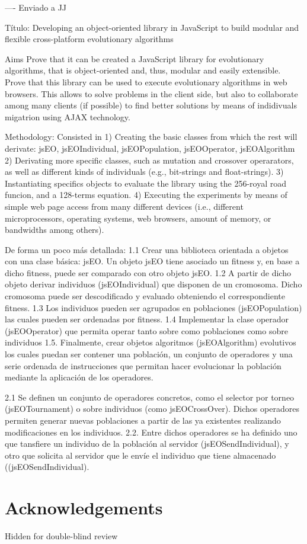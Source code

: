 \documentclass{llncs}
\begin{document}
----
Enviado a JJ

Título:
Developing an object-oriented library in JavaScript to build modular and flexible cross-platform evolutionary algorithms 

Aims
Prove that it can be created a JavaScript library for evolutionary algorithms, that is object-oriented and, thus, modular and easily extensible.
Prove that this library can be used to execute evolutionary algorithms in web browsers. This allows to solve problems in the client side, but also to collaborate among many clients (if possible) to find better solutions by means of indidivuals migatrion using AJAX technology.

Methodology:
Consisted in
1) Creating the basic classes from which the rest will derivate: jsEO, jsEOIndividual, jsEOPopulation, jsEOOperator, jsEOAlgorithm
2) Derivating more specific classes, such as mutation and crossover operarators, as well as different kinds of individuals (e.g., bit-strings and float-strings).
3) Instantiating specifics objects to evaluate the library using the 256-royal road funcion, and a 128-terms equation.
4) Executing the experiments by means of simple web page access from many different devices (i.e., different microprocessors, operating systems, web browsers, amount of memory, or bandwidths among others).




De forma un poco más detallada:
1.1 Crear una biblioteca orientada a objetos con una clase básica: jsEO. Un objeto jsEO tiene asociado un fitness y, en base a dicho fitness, puede ser comparado con otro objeto jsEO.
1.2 A partir de dicho objeto derivar individuos (jsEOIndividual) que disponen de un cromosoma. Dicho cromosoma puede ser descodificado y evaluado obteniendo el correspondiente fitness.
1.3 Los individuos pueden ser agrupados en poblaciones (jsEOPopulation) las cuales pueden ser ordenadas por fitness.
1.4 Implementar la clase operador (jsEOOperator) que permita operar tanto sobre como poblaciones como sobre individuos
1.5. Finalmente, crear objetos algoritmos (jsEOAlgorithm) evolutivos los cuales puedan ser contener una población, un conjunto de operadores y una serie ordenada de instrucciones que permitan hacer evolucionar la población mediante la aplicación de los operadores.

2.1 Se definen un conjunto de operadores concretos, como el selector por torneo (jsEOTournament) o sobre individuos (como jsEOCrossOver). Dichos operadores permiten generar nuevas poblaciones a partir de las ya existentes realizando modificaciones en los individuos. 
2.2. Entre dichos operadores se ha definido uno que tansfiere un individuo de la población al servidor (jsEOSendIndividual), y otro que solicita al servidor que le envíe el individuo que tiene almacenado ((jsEOSendIndividual).

\section*{Acknowledgements}

Hidden for double-blind review




\end{document}
